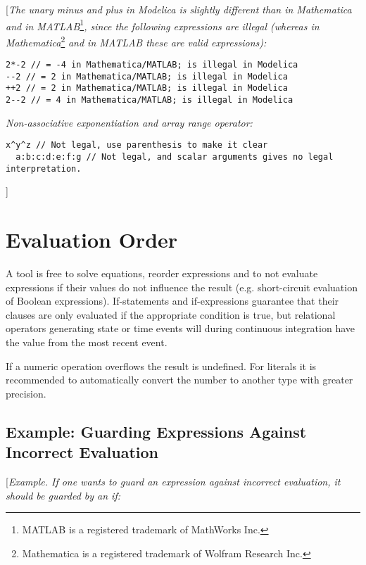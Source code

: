 {[}\emph{The unary minus and plus in Modelica is slightly different than
in Mathematica and in MATLAB}\footnote{MATLAB is a registered trademark
  of MathWorks Inc.}\emph{, since the following expressions are illegal
(whereas in Mathematica}\footnote{Mathematica is a registered trademark
  of Wolfram Research Inc.} \emph{and in MATLAB these are valid
expressions):}
\begin{lstlisting}[language=modelica]
2*-2 // = -4 in Mathematica/MATLAB; is illegal in Modelica
--2 // = 2 in Mathematica/MATLAB; is illegal in Modelica
++2 // = 2 in Mathematica/MATLAB; is illegal in Modelica
2--2 // = 4 in Mathematica/MATLAB; is illegal in Modelica
\end{lstlisting}

\emph{Non-associative exponentiation and array range operator:}

\begin{lstlisting}[language=modelica]
  x^y^z // Not legal, use parenthesis to make it clear
  a:b:c:d:e:f:g // Not legal, and scalar arguments gives no legal interpretation.
\end{lstlisting}
{]}

\section{Evaluation Order}

A tool is free to solve equations, reorder expressions and to not
evaluate expressions if their values do not influence the result (e.g.
short-circuit evaluation of Boolean expressions). If-statements and
if-expressions guarantee that their clauses are only evaluated if the
appropriate condition is true, but relational operators generating state
or time events will during continuous integration have the value from
the most recent event.

If a numeric operation overflows the result is undefined. For literals
it is recommended to automatically convert the number to another type
with greater precision.

\subsection{Example: Guarding Expressions Against Incorrect Evaluation}

{[}\emph{Example. If one wants to guard an expression against incorrect
evaluation, it should be guarded by an if:}

